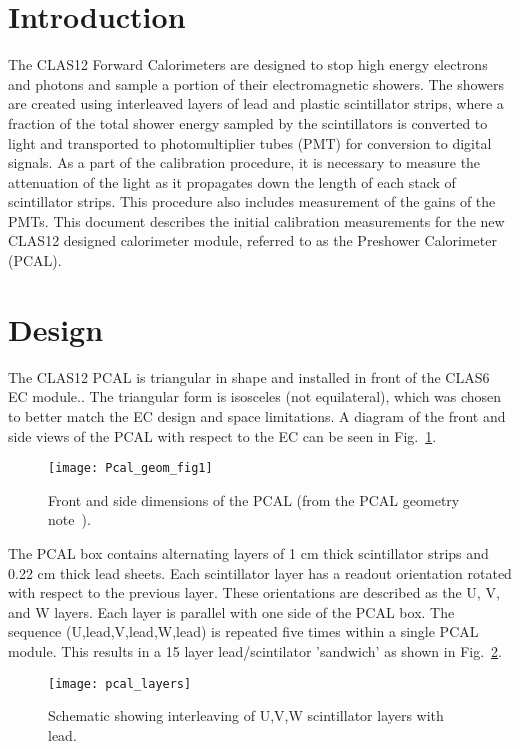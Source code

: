 \FloatBarrier

\section{Introduction}
The CLAS12 Forward Calorimeters are designed to stop high energy electrons and photons and sample a portion of their electromagnetic showers.  The showers are created using interleaved layers of lead and plastic scintillator strips, where a fraction of the total shower energy sampled by the scintillators is converted to light and transported to photomultiplier tubes (PMT) for conversion to digital signals.  As a part of the calibration procedure, it is necessary to measure the attenuation of the light as it propagates down the length of each stack of scintillator strips.  This procedure also includes measurement of the gains of the PMTs.  This document describes the initial calibration measurements for the new CLAS12 designed calorimeter module, referred to as the Preshower Calorimeter (PCAL).

\section{Design}
The CLAS12 PCAL is triangular in shape and installed in front of the CLAS6 EC module.. The triangular form is isosceles (not equilateral), which was chosen
to better match the EC design and space limitations. A diagram of the front and side views of the PCAL with respect to the EC can be seen in 
Fig.~\ref{fig:geomfig1}. 

\begin{figure}[h]
    \centering
    \texttt{[image: Pcal\_geom\_fig1]}
    \caption{Front and side dimensions of the PCAL (from the PCAL geometry note~\cite{bib:geomnote}).}
    \label{fig:geomfig1}
\end{figure}

The PCAL box contains alternating layers of 1 cm thick scintillator strips and 0.22 cm thick lead sheets. Each scintillator layer has a readout orientation rotated with respect to the previous layer. These orientations are described as the U, V, and W layers. Each layer is parallel with one side of the PCAL box. The sequence (U,lead,V,lead,W,lead) is repeated five times within a single PCAL module. This results in a 15 layer lead/scintilator 'sandwich' as shown in Fig.~\ref{fig:geomfig4}.

\begin{figure}[h]
    \centering
    \texttt{[image: pcal\_layers]}
    \caption{Schematic showing interleaving of U,V,W scintillator layers with lead.}
    \label{fig:geomfig4}
\end{figure}

